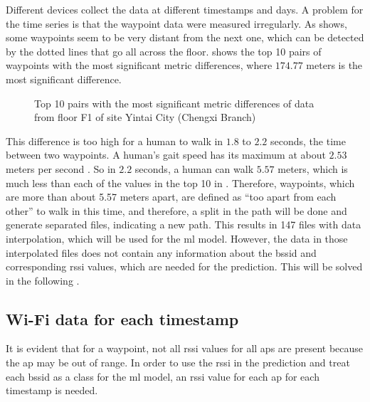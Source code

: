 Different devices collect the data at different timestamps and days.
A problem for the time series is that the waypoint data were measured irregularly.
As  shows, some waypoints seem to be very distant from the next one, which can be detected by the dotted lines that go all across the floor.
 shows the top 10 pairs of waypoints with the most significant metric differences, where \(174.77\) meters is the most significant difference.\\

\begin{figure}[h]
    \centering
    \caption{Top 10 pairs with the most significant metric differences of data from floor F1 of site Yintai City (Chengxi Branch)}

    
    \label{tab:metric-diff}
\end{figure}

This difference is too high for a human to walk in \(1.8\) to \(2.2\) seconds, the time between two waypoints.
A human's gait speed has its maximum at about \(2.53\) meters per second \cite{bohannonComfortableMaximumWalking1997}.
So in \(2.2\) seconds, a human can walk \(5.57\) meters, which is much less than each of the values in the top 10 in .
Therefore, waypoints, which are more than about 5.57 meters apart, are defined as ``too apart from each other'' to walk in this time, and therefore, a split in the path will be done and generate separated files, indicating a new path.
This results in 147 files with data interpolation, which will be used for the \ac{ml} model.
However, the data in those interpolated files does not contain any information about the \ac{bssid} and corresponding \ac{rssi} values, which are needed for the prediction.
This will be solved in the following .


\subsection{Wi-Fi data for each timestamp}\label{sec:wifi-data}
It is evident that for a waypoint, not all \ac{rssi} values for all \acp{ap} are present because the \ac{ap} may be out of range.
In order to use the \ac{rssi} in the prediction and treat each \ac{bssid} as a class for the \ac{ml} model, an \ac{rssi} value for each \ac{ap} for each timestamp is needed.

